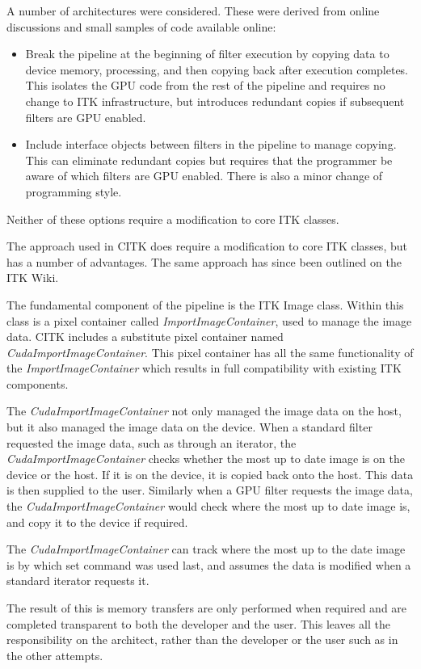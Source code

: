 \documentclass{InsightArticle}
\begin{document}
A number of architectures were considered. These were derived from online discussions and small samples of code available online:
\begin{itemize}
\item Break the pipeline at the beginning of filter execution by
  copying data to device memory, processing, and then copying back
  after execution completes. This isolates the GPU code from the rest
  of the pipeline and requires no change to ITK infrastructure, but
  introduces redundant copies if subsequent filters are GPU enabled.
\item Include interface objects between filters in the pipeline to
  manage copying. This can eliminate redundant copies but requires
  that the programmer be aware of which filters are GPU enabled. There
  is also a minor change of programming style.
\end{itemize}

Neither of these options require a modification to core ITK classes.

The approach used in CITK does require a modification to core ITK
classes, but has a number of advantages. The same approach has since
been outlined on the ITK Wiki.

The fundamental component of the pipeline is the ITK Image
class. Within this class is a pixel container called {\em
  ImportImageContainer}, used to manage the image data. CITK includes
a substitute pixel container named {\em
  CudaImportImageContainer}. This pixel container has all the same
functionality of the {\em ImportImageContainer} which results in full
compatibility with existing ITK components.

The {\em CudaImportImageContainer} not only managed the image data on
the host, but it also managed the image data on the device. When a
standard filter requested the image data, such as through an iterator,
the {\em CudaImportImageContainer} checks whether the most up to date
image is on the device or the host. If it is on the device, it is
copied back onto the host. This data is then supplied to the
user. Similarly when a GPU filter requests the image data, the {\em
  CudaImportImageContainer} would check where the most up to date
image is, and copy it to the device if required.

The {\em CudaImportImageContainer} can track where the most up to the
date image is by which set command was used last, and assumes the data
is modified when a standard iterator requests it.

The result of this is memory transfers are only performed when
required and are completed transparent to both the developer and the
user. This leaves all the responsibility on the architect, rather than
the developer or the user such as in the other attempts.
\end{document}
